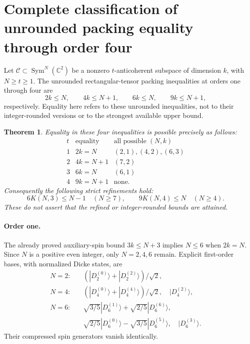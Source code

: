 \documentclass{article}
\newtheorem{theorem}{Theorem}
\begin{document}
\section*{Complete classification of unrounded packing equality through order four}
Let $\mathcal C\subset\operatorname{Sym}^N(\mathbb C^2)$ be a nonzero
$t$-anticoherent subspace of dimension $k$, with $N\ge t\ge1$.
The unrounded rectangular-tensor packing inequalities at orders one
through four are
\[
2k\le N,\qquad4k\le N+1,\qquad6k\le N,\qquad9k\le N+1,
\]
respectively. Equality here refers to these unrounded inequalities,
not to their integer-rounded versions or to the strongest available
upper bound.

\begin{theorem}
Equality in these four inequalities is possible precisely as follows:
\[
\begin{array}{c|c|c}
 t&\text{equality}&\text{all possible }(N,k)\\\hline
 1&2k=N&(2,1),(4,2),(6,3)\\
 2&4k=N+1&(7,2)\\
 3&6k=N&(6,1)\\
 4&9k=N+1&\text{none}.
\end{array}
\]
Consequently the following strict refinements hold:
\[
\boxed{6K(N,3)\le N-1\quad(N\ge7),}
\qquad
\boxed{9K(N,4)\le N\quad(N\ge4).}
\]
These do not assert that the refined or integer-rounded bounds are attained.
\end{theorem}

\paragraph{Order one.}
The already proved auxiliary-spin bound $3k\le N+3$ implies $N\le6$
when $2k=N$. Since $N$ is a positive even integer, only $N=2,4,6$
remain. Explicit first-order bases, with normalized Dicke states, are
\begin{align*}
N=2:&\quad (|D_2^{(0)}\rangle+|D_2^{(2)}\rangle)/\sqrt2,\\
N=4:&\quad (|D_4^{(0)}\rangle+|D_4^{(4)}\rangle)/\sqrt2,
                   \quad |D_4^{(2)}\rangle,\\
N=6:&\quad \sqrt{3/5}|D_6^{(1)}\rangle+\sqrt{2/5}|D_6^{(6)}\rangle,\\
&\quad \sqrt{2/5}|D_6^{(0)}\rangle-\sqrt{3/5}|D_6^{(5)}\rangle,
                   \quad |D_6^{(3)}\rangle.
\end{align*}
Their compressed spin generators vanish identically.
\end{document}
